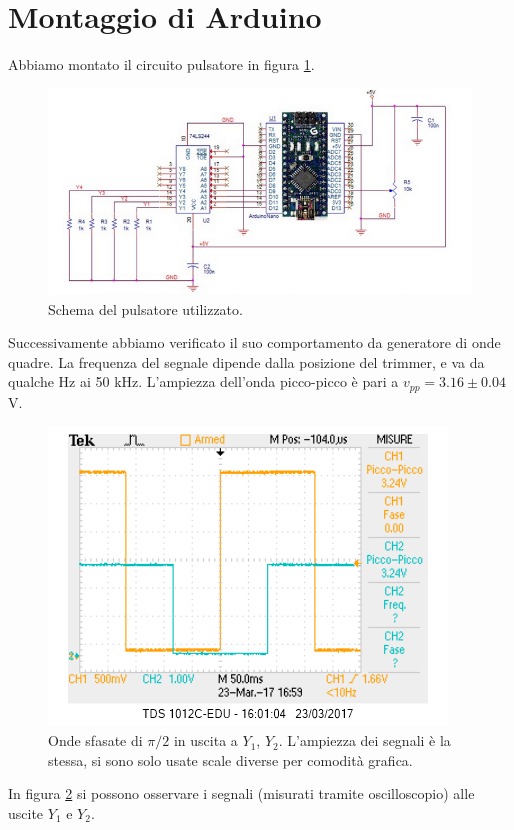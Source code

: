 \documentclass[10pt,a4paper]{article}
\begin{document}
\section{Montaggio di Arduino}
Abbiamo montato il circuito pulsatore in figura \ref{fig:arduino}.
\begin{figure}[!htb]
\centering
\includegraphics[scale=0.7]{arduino.png}
\caption{Schema del pulsatore utilizzato.\label{fig:arduino}}
\end{figure}
Successivamente abbiamo verificato il suo comportamento da generatore di onde quadre. La frequenza del segnale dipende dalla posizione del trimmer, e va da qualche Hz ai 50 kHz. L'ampiezza dell'onda picco-picco è pari a $v_{pp}=3.16\pm 0.04$V.
\begin{figure}[!htb]
\centering
\includegraphics[scale=0.7]{ondaardu.png}
\caption{Onde sfasate di $\pi/2$ in uscita a $Y_1$, $Y_2$. L'ampiezza dei segnali è la stessa, si sono solo usate scale diverse per comodità grafica.\label{fig:ondaardu}}
\end{figure}
In figura \ref{fig:ondaardu} si possono osservare i segnali (misurati tramite oscilloscopio) alle uscite $Y_1$ e $Y_2$.
\end{document}
